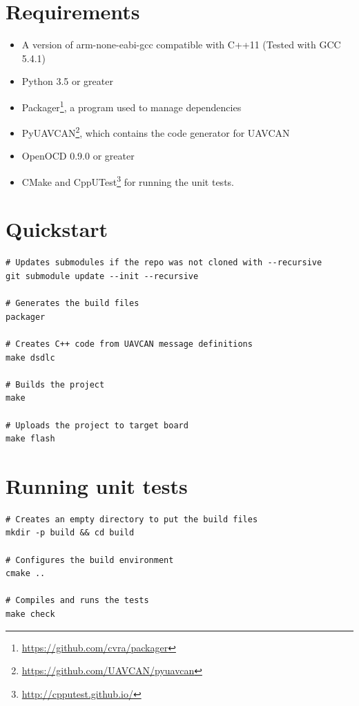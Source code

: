 \section{Requirements}\label{requirements}

\begin{itemize}
\tightlist
\item
  A version of arm-none-eabi-gcc compatible with C++11 (Tested with GCC
  5.4.1)
\item
  Python 3.5 or greater
\item
  Packager\footnote{\url{https://github.com/cvra/packager}}, a program used to
  manage dependencies
\item
  PyUAVCAN\footnote{\url{https://github.com/UAVCAN/pyuavcan}}, which contains
  the code generator for UAVCAN
\item
  OpenOCD 0.9.0 or greater
\item
  CMake and CppUTest\footnote{\url{http://cpputest.github.io/}} for running the
  unit tests.
\end{itemize}

\section{Quickstart}\label{quickstart}

\begin{verbatim}
# Updates submodules if the repo was not cloned with --recursive
git submodule update --init --recursive

# Generates the build files
packager

# Creates C++ code from UAVCAN message definitions
make dsdlc

# Builds the project
make

# Uploads the project to target board
make flash
\end{verbatim}

\section{Running unit tests}\label{running-unit-tests}

\begin{verbatim}
# Creates an empty directory to put the build files
mkdir -p build && cd build

# Configures the build environment
cmake ..

# Compiles and runs the tests
make check
\end{verbatim}

